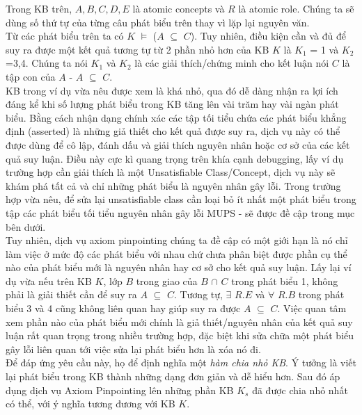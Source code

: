 Trong KB trên, $A, B, C, D, E$ là atomic concepts và $R$ là atomic role.  Chúng ta sẽ dùng số thứ tự của từng câu phát biểu trên thay vì lặp lại nguyên văn.
\\
\hspace*{0.05\textwidth} Từ các phát biểu trên ta có $K$ $\models$ ($A$ $\subseteq$ $C$). Tuy nhiên, điều kiện cần và đủ để suy ra được một kết quả tương tự từ 2 phần nhỏ hơn của KB $K$ là $K_{1}$ = {1} và $K_{2}$ ={3,4}. Chúng ta nói $K_{1}$ và $K_{2}$ là các giải thích/chứng minh cho kết luận nói $C$ là tập con của $A$ - $A$ $\subseteq$ $C$.
\\
\hspace*{0.05\textwidth} KB trong ví dụ vừa nêu được xem là khá nhỏ, qua đó dễ dàng nhận ra lợi ích đáng kể khi số lượng phát biểu trong KB tăng lên vài trăm hay vài ngàn phát biểu. Bằng cách nhận dạng chính xác các tập tối tiểu chứa các phát biểu khẳng định (asserted) là những giả thiết cho kết quả được suy ra, dịch vụ này có thể được dùng để cô lập, đánh dấu và giải thích nguyên nhân hoặc cơ sở của các kết quả suy luận. Điều này cực kì quang trọng trên khía cạnh debugging, lấy ví dụ trường hợp cần giải thích là một Unsatisfiable Class/Concept, dịch vụ này sẽ khám phá tất cả và chỉ những phát biểu là nguyên nhân gây lỗi. Trong trường hợp vừa nêu, để sửa lại unsatisfiable class cần loại bỏ ít nhất một phát biểu trong tập các phát biểu tối tiểu nguyên nhân gây lỗi MUPS - sẽ được đề cập trong mục bên dưới.
\\
\hspace*{0.05\textwidth} Tuy nhiên, dịch vụ axiom pinpointing chúng ta đề cập có một giới hạn là nó chỉ làm việc ở mức độ các phát biểu với nhau chứ chưa phân biệt được phần cụ thể nào của phát biểu mới là nguyên nhân hay cơ sở cho kết quả suy luận. Lấy lại ví dụ vừa nếu trên KB $K$, lớp $B$ trong giao của $B$ $\cap$ $C$ trong phát biểu 1, không phải là giải thiết cần để suy ra $A$ $\subseteq$ $C$. Tương tự, $\exists$ $R.E$ và $\forall$ $R.B$ trong phát biểu 3 và 4 cũng không liên quan hay giúp suy ra được $A$ $\subseteq$ $C$. Việc quan tâm xem phần nào của phát biểu mới chính là giả thiết/nguyên nhân của kết quả suy luận rất quan trọng trong nhiều trường hợp, đặc biệt khi sửa chữa một phát biểu gây lỗi liên quan tới việc sửa lại phát biểu hơn là xóa nó đi.
\\
\hspace*{0.05\textwidth} Để đáp ứng yêu cầu này, họ để định nghĩa một \textit{hàm chia nhỏ KB}. Ý tưởng là viết lại phát biểu trong KB thành những dạng đơn giản và dễ hiểu hơn. Sau đó áp dụng dịch vụ Axiom Pinpointing lên những phần KB $K_{s}$ đã được chia nhỏ nhất có thể, với ý nghĩa tương đương với KB $K$.
